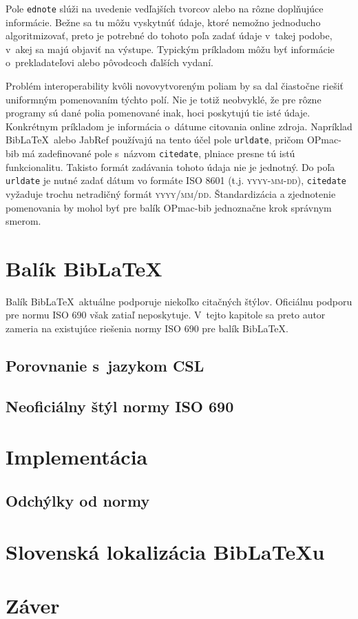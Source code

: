 \documentclass{fithesis3}
\begin{document}
    Pole \texttt{ednote} slúži na uvedenie vedľajších tvorcov alebo na rôzne doplňujúce informácie. Bežne sa tu môžu vyskytnúť údaje, ktoré nemožno jednoducho algoritmizovať, preto je potrebné do tohoto poľa zadať údaje v~takej podobe, v~akej sa majú objaviť na výstupe. Typickým príkladom môžu byť informácie o~prekladateľovi alebo pôvodcoch ďalších vydaní.

    Problém interoperability kvôli novovytvoreným poliam by sa dal čiastočne riešiť uniformným pomenovaním týchto polí. Nie je totiž neobvyklé, že pre rôzne programy sú dané polia pomenované inak, hoci poskytujú tie isté údaje. Konkrétnym príkladom je informácia o~dátume citovania online zdroja. Napríklad Bib\LaTeX\ alebo JabRef používajú na tento účel pole \texttt{urldate}, pričom OPmac-bib má zadefinované pole s~názvom \texttt{citedate}, plniace presne tú istú funkcionalitu. Takisto formát zadávania tohoto údaja nie je jednotný. Do poľa \texttt{urldate} je nutné zadať dátum vo formáte ISO 8601 (t.j. \textsc{yyyy-mm-dd}), \texttt{citedate} vyžaduje trochu netradičný formát \textsc{yyyy/mm/dd}. Štandardizácia a zjednotenie pomenovania by mohol byť pre balík OPmac-bib jednoznačne krok správnym smerom.

\chapter{Balík Bib\LaTeX}
Balík Bib\LaTeX\, aktuálne podporuje niekoľko citačných štýlov. Oficiálnu podporu pre normu ISO 690 však zatiaľ neposkytuje. V~tejto kapitole sa preto autor zameria na existujúce riešenia normy ISO 690 pre balík Bib\LaTeX.

	\section{Porovnanie s~jazykom CSL}
	\section{Neoficiálny štýl normy ISO 690}

\chapter{Implementácia}
	\section{Odchýlky od normy}

\chapter{Slovenská lokalizácia Bib\LaTeX u}

\chapter{Záver}

\printbibliography[heading=bibintoc]
\end{document}
